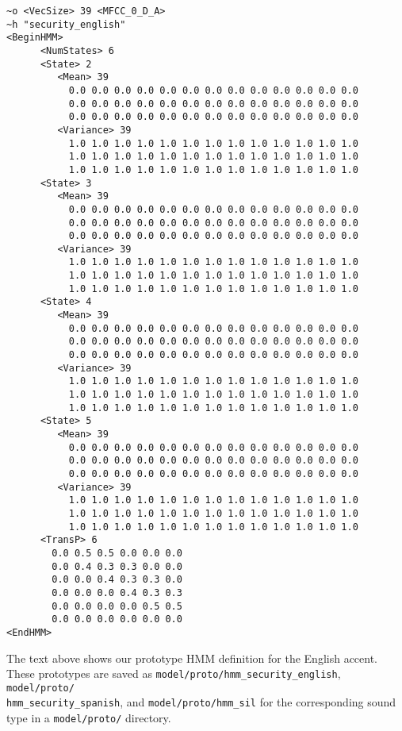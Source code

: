 \documentclass{wileySev}
\begin{document}
\begin{verbatim}
~o <VecSize> 39 <MFCC_0_D_A>
~h "security_english"
<BeginHMM>
      <NumStates> 6
      <State> 2
         <Mean> 39
           0.0 0.0 0.0 0.0 0.0 0.0 0.0 0.0 0.0 0.0 0.0 0.0 0.0
           0.0 0.0 0.0 0.0 0.0 0.0 0.0 0.0 0.0 0.0 0.0 0.0 0.0
           0.0 0.0 0.0 0.0 0.0 0.0 0.0 0.0 0.0 0.0 0.0 0.0 0.0
         <Variance> 39
           1.0 1.0 1.0 1.0 1.0 1.0 1.0 1.0 1.0 1.0 1.0 1.0 1.0
           1.0 1.0 1.0 1.0 1.0 1.0 1.0 1.0 1.0 1.0 1.0 1.0 1.0
           1.0 1.0 1.0 1.0 1.0 1.0 1.0 1.0 1.0 1.0 1.0 1.0 1.0
      <State> 3
         <Mean> 39
           0.0 0.0 0.0 0.0 0.0 0.0 0.0 0.0 0.0 0.0 0.0 0.0 0.0
           0.0 0.0 0.0 0.0 0.0 0.0 0.0 0.0 0.0 0.0 0.0 0.0 0.0
           0.0 0.0 0.0 0.0 0.0 0.0 0.0 0.0 0.0 0.0 0.0 0.0 0.0
         <Variance> 39
           1.0 1.0 1.0 1.0 1.0 1.0 1.0 1.0 1.0 1.0 1.0 1.0 1.0
           1.0 1.0 1.0 1.0 1.0 1.0 1.0 1.0 1.0 1.0 1.0 1.0 1.0
           1.0 1.0 1.0 1.0 1.0 1.0 1.0 1.0 1.0 1.0 1.0 1.0 1.0
      <State> 4
         <Mean> 39
           0.0 0.0 0.0 0.0 0.0 0.0 0.0 0.0 0.0 0.0 0.0 0.0 0.0
           0.0 0.0 0.0 0.0 0.0 0.0 0.0 0.0 0.0 0.0 0.0 0.0 0.0
           0.0 0.0 0.0 0.0 0.0 0.0 0.0 0.0 0.0 0.0 0.0 0.0 0.0
         <Variance> 39
           1.0 1.0 1.0 1.0 1.0 1.0 1.0 1.0 1.0 1.0 1.0 1.0 1.0
           1.0 1.0 1.0 1.0 1.0 1.0 1.0 1.0 1.0 1.0 1.0 1.0 1.0
           1.0 1.0 1.0 1.0 1.0 1.0 1.0 1.0 1.0 1.0 1.0 1.0 1.0
      <State> 5
         <Mean> 39
           0.0 0.0 0.0 0.0 0.0 0.0 0.0 0.0 0.0 0.0 0.0 0.0 0.0
           0.0 0.0 0.0 0.0 0.0 0.0 0.0 0.0 0.0 0.0 0.0 0.0 0.0
           0.0 0.0 0.0 0.0 0.0 0.0 0.0 0.0 0.0 0.0 0.0 0.0 0.0
         <Variance> 39
           1.0 1.0 1.0 1.0 1.0 1.0 1.0 1.0 1.0 1.0 1.0 1.0 1.0
           1.0 1.0 1.0 1.0 1.0 1.0 1.0 1.0 1.0 1.0 1.0 1.0 1.0
           1.0 1.0 1.0 1.0 1.0 1.0 1.0 1.0 1.0 1.0 1.0 1.0 1.0
      <TransP> 6
        0.0 0.5 0.5 0.0 0.0 0.0
        0.0 0.4 0.3 0.3 0.0 0.0
        0.0 0.0 0.4 0.3 0.3 0.0
        0.0 0.0 0.0 0.4 0.3 0.3
        0.0 0.0 0.0 0.0 0.5 0.5
        0.0 0.0 0.0 0.0 0.0 0.0
<EndHMM>
\end{verbatim}
The text above shows our prototype HMM definition for the English accent. These prototypes are saved as \texttt{model/proto/hmm\_security\_english}, \texttt{model/proto/}\\
\texttt{hmm\_security\_spanish}, and \texttt{model/proto/hmm\_sil} for the corresponding sound type in a \texttt{model/proto/} directory.
\end{document}
